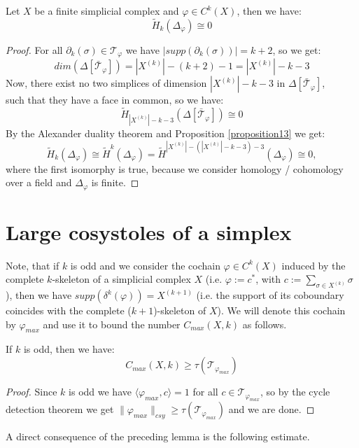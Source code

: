 \begin{prop}
Let \(X\) be a finite simplicial complex and \(\varphi\in C^k(X)\), then we have:
\[
\tilde{H}_k(\Delta_{\varphi})\cong 0
\]
\begin{proof}
For all \(\partial_k(\sigma)\in\mathcal{T}_{\varphi}\) we have \(|supp(\partial_k(\sigma))|=k+2\), so we get:
\[
dim(\Delta[\bar{\mathcal{T}}_{\varphi}])=|X^{(k)}|-(k+2)-1=|X^{(k)}|-k-3
\]
Now, there exist no two simplices of dimension \(|X^{(k)}|-k-3\) in \(\Delta[\bar{\mathcal{T}}_{\varphi}]\),\\
such that they have a face in common, so we have:
\[
\tilde{H}_{|X^{(k)}|-k-3}(\Delta[\bar{\mathcal{T}}_{\varphi}])\cong 0
\]
By the Alexander duality theorem and Proposition \ref{proposition13} we get:
\[
\tilde{H}_k(\Delta_{\varphi})\cong\tilde{H}^k(\Delta_{\varphi})=\tilde{H}^{|X^{(k)}|-(|X^{(k)}|-k-3)-3}(\Delta_{\varphi})\cong 0,
\]
where the first isomorphy is true, because we consider homology / cohomology over a field and \(\Delta_{\varphi}\) is finite.
\end{proof}
\end{prop}

\section{Large cosystoles of a simplex}

Note, that if \(k\) is odd and we consider the cochain \(\varphi\in C^k(X)\) induced by the complete \(k\)-skeleton of a simplicial complex \(X\) (i.e. \(\varphi:=c^*\), with \(c:=\sum\limits_{\sigma\in X^{(k)}}\sigma\)), then we have \(supp(\delta^k(\varphi))=X^{(k+1)}\) (i.e. the support of its coboundary coincides with the complete (\(k+1\))-skeleton of \(X\)). We will denote this cochain by \(\varphi_{max}\) and use it to bound the number \(C_{max}(X,k)\) as follows.

\begin{lem}\label{lemma10}
If \(k\) is odd, then we have:
\[
C_{max}(X,k)\geq\tau(\mathcal{T}_{\varphi_{max}})
\]
\begin{proof}
Since \(k\) is odd we have \(\langle\varphi_{max},c\rangle=1\) for all \(c\in \mathcal{T}_{\varphi_{max}}\), so by the cycle detection theorem we get \(\|\varphi_{max}\|_{csy}\geq\tau(\mathcal{T}_{\varphi_{max}})\) and we are done.
\end{proof}
\end{lem}

A direct consequence of the preceding lemma is the following estimate.

